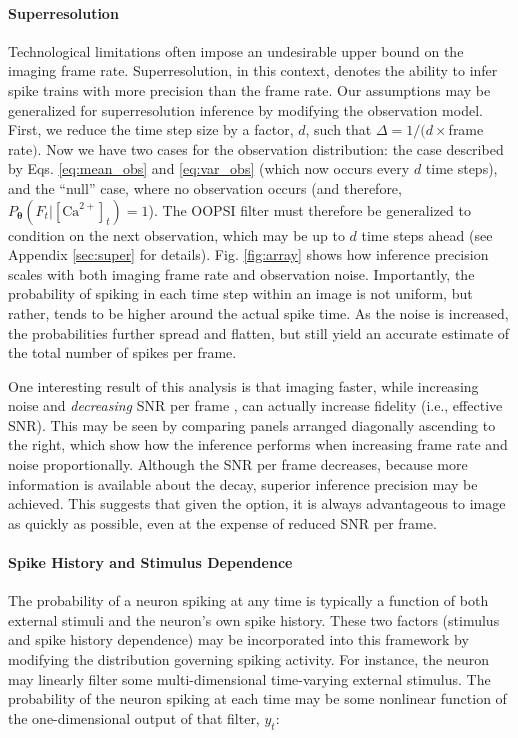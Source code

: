 \documentclass[12pt]{article}
\providecommand{\ve}[1]{\boldsymbol{#1}}
\providecommand{\ve}[1]{\boldsymbol{#1}}
\newcommand{\thetn}{\ve{\theta}}
\newcommand{\p}{P_{\thetn}}
\newcommand{\Ca}{[\text{Ca}^{2+}]}
\begin{document}

\paragraph{Superresolution}

Technological limitations often impose an undesirable upper bound on the imaging frame rate.  Superresolution, in this context, denotes the ability to infer spike trains with more precision than the frame rate. Our assumptions may be generalized for superresolution inference by modifying the observation model. First, we reduce the time step size by a factor, $d$, such that $\Delta=1/(d \times$frame rate$)$.  Now we have two cases for the observation distribution: the case described by Eqs. \ref{eq:mean_obs} and \ref{eq:var_obs} (which now occurs every $d$ time steps), and the ``null'' case, where  no observation occurs (and therefore, $\p(F_t | \Ca_t)=1$).  The OOPSI filter must therefore be generalized to condition on the next observation, which may be up to $d$ time steps ahead (see Appendix \ref{sec:super} for details).  Fig. \ref{fig:array} shows how inference precision scales with both imaging frame rate and observation noise. Importantly, the probability of spiking in each time step within an image is not uniform, but rather, tends to be higher around the actual spike time. As the noise is increased, the probabilities further spread and flatten, but still yield an accurate estimate of the total number of spikes per frame.  

One interesting result of this analysis is that imaging faster, while increasing noise and \emph{decreasing} SNR per frame \cite{SjulsonMiesenbock07}, can actually increase fidelity (i.e., effective SNR).  This may be seen by comparing panels arranged diagonally ascending to the right, which show how the inference performs when increasing frame rate and noise proportionally.  Although the SNR per frame decreases, because more information is available about the decay, superior inference precision may be achieved. This suggests that given the option, it is always advantageous to image as quickly as possible, even at the expense of reduced SNR per frame.

\paragraph{Spike History and Stimulus Dependence}

The probability of a neuron spiking at any time is typically a function of both external stimuli and the neuron's own spike history.   These two factors (stimulus and spike history dependence) may be incorporated into this framework by modifying the distribution governing spiking activity. For instance, the neuron may linearly filter some multi-dimensional time-varying external stimulus.  The probability of the neuron spiking at each time may be some nonlinear function of the one-dimensional output of that filter, $y_t$:   
\end{document}
